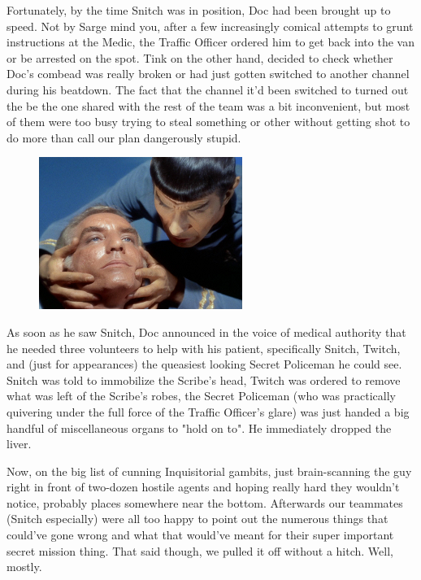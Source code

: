 Fortunately, by the time Snitch was in position, Doc had been brought up to speed. 
Not by Sarge mind you, after a few increasingly comical attempts to grunt instructions at the Medic, the Traffic Officer ordered him to get back into the van or be arrested on the spot. 
Tink on the other hand, decided to check whether Doc's combead was really broken or had just gotten switched to another channel during his beatdown. 
The fact that the channel it'd been switched to turned out the be the one shared with the rest of the team was a bit inconvenient, but most of them were too busy trying to steal something or other without getting shot to do more than call our plan dangerously stupid.

\begin{figure}
	\begin{center}
		\includegraphics[width=\figwidth]{pics/17/52.png}
	\end{center}
\end{figure}
As soon as he saw Snitch, Doc announced in the voice of medical authority that he needed three volunteers to help with his patient, specifically Snitch, Twitch, and (just for appearances) the queasiest looking Secret Policeman he could see. 
Snitch was told to immobilize the Scribe's head, Twitch was ordered to remove what was left of the Scribe's robes, the Secret Policeman (who was practically quivering under the full force of the Traffic Officer's glare) was just handed a big handful of miscellaneous organs to "hold on to". 
He immediately dropped the liver.

Now, on the big list of cunning Inquisitorial gambits, just brain-scanning the guy right in front of two-dozen hostile agents and hoping really hard they wouldn't notice, probably places somewhere near the bottom. 
Afterwards our teammates (Snitch especially) were all too happy to point out the numerous things that could've gone wrong and what that would've meant for their super important secret mission thing. 
That said though, we pulled it off without a hitch. 
Well, mostly. 


